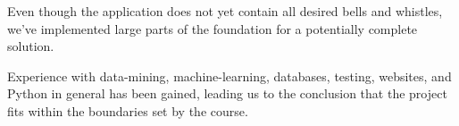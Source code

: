 \documentclass[Main]{subfiles}
\begin{document}
Even though the application does not yet contain all desired bells and whistles,
we've implemented large parts of the foundation for a potentially complete solution.

Experience with data-mining, machine-learning, databases, testing, websites, and Python in general has been gained,
leading us to the conclusion that the project fits within the boundaries set by the course.
\end{document}
